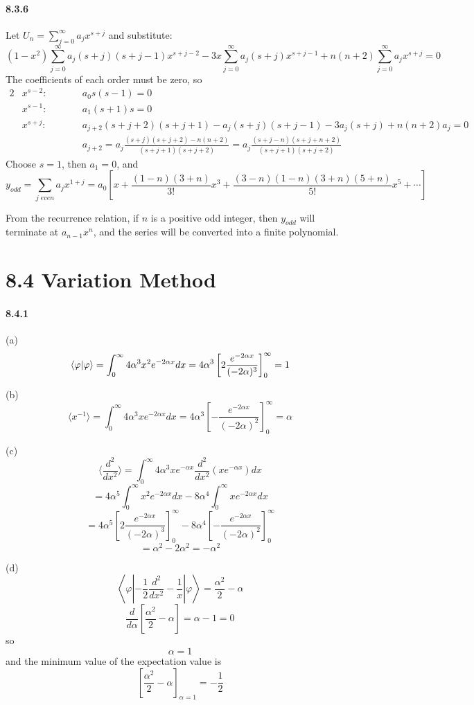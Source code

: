 \documentclass[a4paper]{article}
\begin{document}
\paragraph{8.3.6}
Let $U_n=\sum_{j=0}^\infty a_jx^{s+j}$ and substitute:
\[
(1-x^2)\sum_{j=0}^\infty a_j(s+j)(s+j-1)x^{s+j-2}-3x\sum_{j=0}^\infty a_j(s+j)x^{s+j-1}+n(n+2)\sum_{j=0}^\infty a_jx^{s+j}=0
\]
The coefficients of each order must be zero, so
\begin{alignat*}{2}
    & x^{s-2}:\qquad && a_0s(s-1)=0\\
    & x^{s-1}:\qquad && a_1(s+1)s=0\\
    & x^{s+j}:\qquad && a_{j+2}(s+j+2)(s+j+1)-a_j(s+j)(s+j-1)-3a_j(s+j)+n(n+2)a_j=0\\
    & && a_{j+2}=a_j\frac{(s+j)(s+j+2)-n(n+2)}{(s+j+1)(s+j+2)}=a_j\frac{(s+j-n)(s+j+n+2)}{(s+j+1)(s+j+2)}
\end{alignat*}
Choose $s=1$, then $a_1=0$, and
\[
y_{odd}=\sum_{j\;even}a_jx^{1+j}=a_0\left[x+\frac{(1-n)(3+n)}{3!}x^3+\frac{(3-n)(1-n)(3+n)(5+n)}{5!}x^5+\cdots \right]
\]

From the recurrence relation, if $n$ is a positive odd integer, then $y_{odd}$ will terminate at $a_{n-1}x^{n}$, and the series will be converted into a finite polynomial.

\section*{8.4 Variation Method}

\paragraph{8.4.1}
(a) 
\[
\langle\varphi|\varphi\rangle=\int_0^\infty4\alpha^3x^2e^{-2\alpha x}dx=4\alpha^3\left[2\frac{e^{-2\alpha x}}{(-2\alpha)^3} \right]_0^\infty=1
\]

(b)
\[
\langle x^{-1}\rangle=\int_0^\infty 4\alpha^3xe^{-2\alpha x}dx=4\alpha^3\left[-\frac{e^{-2\alpha x}}{(-2\alpha)^2} \right]_0^\infty=\alpha
\]

(c)
\[
\langle\frac{d^2}{dx^2}\rangle=\int_0^\infty4\alpha^3xe^{-\alpha x}\frac{d^2}{dx^2}(xe^{-\alpha x})dx
\]
\[
=4\alpha^5\int_0^\infty x^2e^{-2\alpha x}dx-8\alpha^4\int_0^\infty xe^{-2\alpha x}dx
\]
\[
=4\alpha^5\left[2\frac{e^{-2\alpha x}}{(-2\alpha)^3} \right]_0^\infty-8\alpha^4\left[-\frac{e^{-2\alpha x}}{(-2\alpha)^2} \right]_0^\infty
\]
\[
=\alpha^2-2\alpha^2=-\alpha^2
\]

(d)
\[
\left\langle\varphi\left|-\frac{1}{2}\frac{d^2}{dx^2}-\frac{1}{x} \right|\varphi \right\rangle=\frac{\alpha^2}{2}-\alpha
\]
\[
\frac{d}{d\alpha}\left[\frac{\alpha^2}{2}-\alpha\right]=\alpha-1=0
\]
so 
\[
\alpha=1
\]
and the minimum value of the expectation value is
\[
\left[\frac{\alpha^2}{2}-\alpha\right]_{\alpha=1}=-\frac{1}{2}
\]
\end{document}
